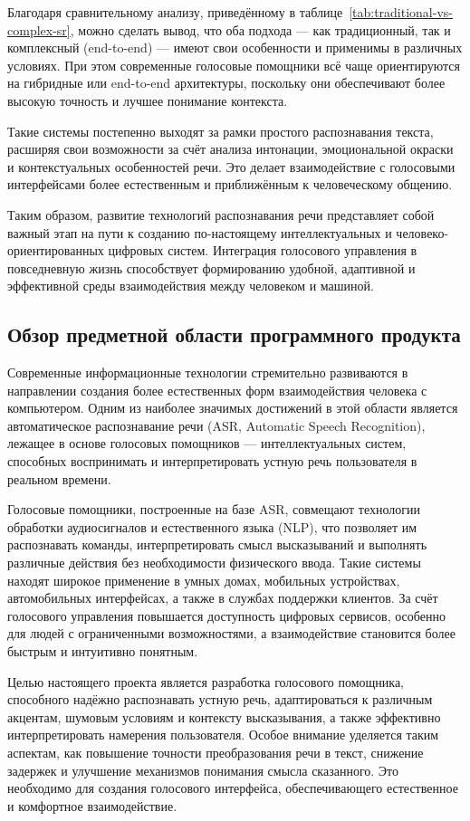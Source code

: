 Благодаря сравнительному анализу, приведённому в таблице~\ref{tab:traditional-vs-complex-sr}, можно сделать вывод, что оба подхода — как традиционный, так и комплексный (end-to-end) — имеют свои особенности и применимы в различных условиях. При этом современные голосовые помощники всё чаще ориентируются на гибридные или end-to-end архитектуры, поскольку они обеспечивают более высокую точность и лучшее понимание контекста.

Такие системы постепенно выходят за рамки простого распознавания текста, расширяя свои возможности за счёт анализа интонации, эмоциональной окраски и контекстуальных особенностей речи. Это делает взаимодействие с голосовыми интерфейсами более естественным и приближённым к человеческому общению.

Таким образом, развитие технологий распознавания речи представляет собой важный этап на пути к созданию по-настоящему интеллектуальных и человеко-ориентированных цифровых систем. Интеграция голосового управления в повседневную жизнь способствует формированию удобной, адаптивной и эффективной среды взаимодействия между человеком и машиной.

\subsection{Обзор предметной области программного продукта}

Современные информационные технологии стремительно развиваются в направлении создания более естественных форм взаимодействия человека с компьютером. Одним из наиболее значимых достижений в этой области является автоматическое распознавание речи (ASR, Automatic Speech Recognition), лежащее в основе голосовых помощников — интеллектуальных систем, способных воспринимать и интерпретировать устную речь пользователя в реальном времени.

Голосовые помощники, построенные на базе ASR, совмещают технологии обработки аудиосигналов и естественного языка (NLP), что позволяет им распознавать команды, интерпретировать смысл высказываний и выполнять различные действия без необходимости физического ввода. Такие системы находят широкое применение в умных домах, мобильных устройствах, автомобильных интерфейсах, а также в службах поддержки клиентов. За счёт голосового управления повышается доступность цифровых сервисов, особенно для людей с ограниченными возможностями, а взаимодействие становится более быстрым и интуитивно понятным.

Целью настоящего проекта является разработка голосового помощника, способного надёжно распознавать устную речь, адаптироваться к различным акцентам, шумовым условиям и контексту высказывания, а также эффективно интерпретировать намерения пользователя. Особое внимание уделяется таким аспектам, как повышение точности преобразования речи в текст, снижение задержек и улучшение механизмов понимания смысла сказанного. Это необходимо для создания голосового интерфейса, обеспечивающего естественное и комфортное взаимодействие.


